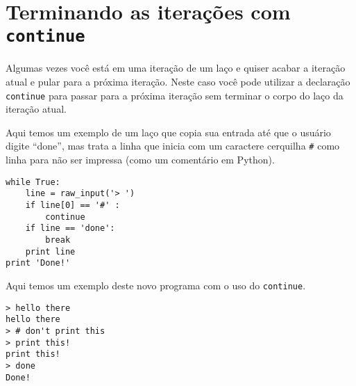 
\section{Terminando as iterações com {\tt continue}}


Algumas vezes você está em uma iteração de um laço e quiser acabar a iteração
atual e pular para a próxima iteração. Neste caso você pode utilizar a
declaração {\tt continue} para passar para a próxima iteração sem terminar o
corpo do laço da iteração atual.


Aqui temos um exemplo de um laço que copia sua entrada até que o usuário
digite ``done'', mas trata a linha que inicia com um caractere cerquilha
{\tt #} como linha para não ser impressa (como um comentário em Python).

\beforeverb
\begin{verbatim}
while True:
    line = raw_input('> ')
    if line[0] == '#' :
        continue
    if line == 'done':
        break
    print line
print 'Done!'
\end{verbatim}
\afterverb
%

%
Aqui temos um exemplo deste novo programa com o uso do {\tt continue}.

\beforeverb
\begin{verbatim}
> hello there
hello there
> # don't print this
> print this!
print this!
> done
Done!
\end{verbatim}
\afterverb
%

